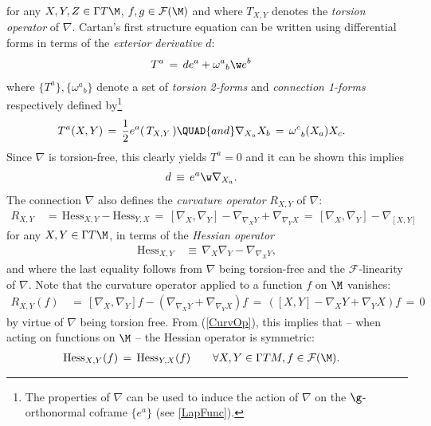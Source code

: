 \documentclass[sections]{tjwNOTES}
\newcommand{\Hess}{\text{Hess}}
\newcommand{\FM}{\mathcal{F}(\M)}
\begin{document}
for any $X,Y,Z\in\Gamma T\M$, $f,g\in\FM$ and where $T_{X,Y}$ denotes the {\it torsion operator} of $\nabla$. Cartan's first structure equation can be written using differential forms in terms of the {\it exterior derivative} $d$:
\begin{align*}
	T^{a} &\,=\, de^{a} + \omega^{a}{}_{b}\w e^{b}
\end{align*}
where $\{T^{a}\}, \{\omega^{a}{}_{b}\}$ denote a set of {\it torsion 2-forms} and {\it connection 1-forms} respectively defined by\footnote{The properties of $\nabla$ can be used to induce the action of $\nabla$ on the $\g$-orthonormal coframe $\{e^{a}\}$ (see \ref{LapFunc}).}
\begin{align*}
	T^{a}(X,Y) &\,=\, \frac{1}{2}e^{a}(\,T_{X,Y}\,) \QUAD{and} \nabla_{X_{a}}X_{b} \,=\, \omega^{c}_{\;\;b}(X_{a})X_{c}.
\end{align*}
Since $\nabla$ is torsion-free, this clearly yields $T^{a}=0$ and it can be shown this implies \cite{BennTucker}
\begin{align}\label{d2nabla}
	d &\,\equiv\, e^{a} \w \nabla_{X_{a}}.
\end{align}
The connection $\nabla$ also defines the {\it curvature operator} $R_{X,Y}$ of $\nabla$:
\begin{align}\label{CurvOp}
	R_{X,Y} &\,=\, \Hess_{X,Y} - \Hess_{Y,X} \,=\, [\nabla_{X},\nabla_{Y}] - \nabla_{\nabla_{X}Y} + \nabla_{\nabla_{Y}X} \,=\, [\nabla_{X},\nabla_{Y}] - \nabla_{[X,Y]} 
\end{align}
for any $X,Y\in\Gamma T\M$, in terms of the {\it Hessian operator}
\begin{align*}
	\Hess_{X,Y} &\,\equiv\, \nabla_{X}\nabla_{Y} - \nabla_{\nabla_{X}Y},
\end{align*}
and where the last equality follows from $\nabla$ being torsion-free and the $\mathcal{F}$-linearity of $\nabla$. Note that the curvature operator applied to a function $f$ on $\M$ vanishes:
\begin{align*}
	R_{X,Y}(f) &\,=\, [\nabla_{X},\nabla_{Y}]f - \left(\nabla_{\nabla_{X}Y} + \nabla_{\nabla_{Y}X}\right)f \,=\, \left([X,Y] - \nabla_{X}Y + \nabla_{Y}X\right)f \,=\,0
\end{align*}
by virtue of $\nabla$ being torsion free. From (\ref{CurvOp}), this implies that -- when acting on functions on $\M$ -- the Hessian operator is symmetric:
\begin{align}\label{SymHess}
	\Hess_{X,Y}(f) &\,=\, \Hess_{Y,X}(f) \qquad\forall X,Y \in \Gamma TM, f\in\FM.
\end{align}
\end{document}
